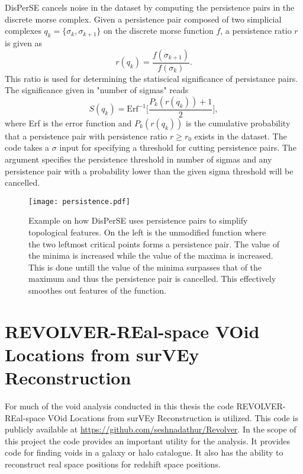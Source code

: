 DisPerSE cancels noise in the dataset by computing the persistence pairs
in the discrete morse complex. Given a persistence pair composed of two
simplicial complexes $q_k=\{\sigma_k,\sigma_{k+1}\}$ on the discrete morse
function $f$, a persistence ratio $r$ is given as
\begin{equation}
    r(q_k)=\frac{f(\sigma_{k+1})}{f(\sigma_k)}.
\end{equation}
This ratio is used for determining the statiscical significance of persistance
pairs. The significance given in "number of sigmas" reads 
\begin{equation}
    S(q_k)=\mathrm{Erf}^{-1}\Big[\frac{P_k(r(q_k))+1}{2}\Big],
\end{equation}
where Erf is the error function and $P_k(r(q_k))$ is the cumulative probability
that a persistence pair with persistence ratio $r\geq r_0$ exists in the
dataset. The code takes a $\sigma$ input for specifying a threshold for cutting
persistence pairs. The argument specifies the persistence threshold in number of
sigmas and any persistence pair with a probability lower than the given sigma
threshold will be cancelled.


\begin{figure}\label{fig:persistence}
   \texttt{[image: persistence.pdf]}
   \caption{Example on how DisPerSE uses persistence pairs to simplify topological features. On the left is the unmodified function where the two leftmost critical points forms a persistence pair. The value of the minima is increased while the value of the maxima is increased. This is done untill the value of the minima surpasses that of the maximum and thus the persistence pair is cancelled. This effectively smoothes out features of the function.}
\end{figure}

\section{REVOLVER-REal-space VOid Locations from surVEy Reconstruction}
For much of the void analysis conducted in this thesis the code
REVOLVER-REal-space VOid Locations from surVEy Reconstruction is utilized. This
code is publicly available at \url{https://github.com/seshnadathur/Revolver}.
In the scope of this project the code provides an important utility for the
analysis. It provides code for finding voids in a galaxy or halo catalogue. It also has the ability
to reconstruct real space positions for redshift space positions.

